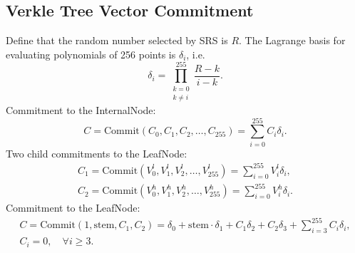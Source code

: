 \subsection{Verkle Tree Vector Commitment}

Define that the random number selected by SRS is $R$. The Lagrange basis for evaluating polynomials of 256 points is $\delta_i$, i.e.
\[ \delta_i = \prod_{\substack{k=0 \\ k\neq i}}^{255} \frac{R - k}{i - k}. \]
Commitment to the InternalNode:
\[ C = \mathrm{Commit}(C_0, C_1, C_2, \ldots, C_{255}) = \sum_{i=0}^{255}C_i\delta_i. \]
Two child commitments to the LeafNode:
\begin{gather*}
    C_1 = \mathrm{Commit}(V^l_0, V^l_1, V^l_2, \ldots, V^l_{255}) = \sum_{i=0}^{255}V^l_i\delta_i, \\
    C_2 = \mathrm{Commit}(V^h_0, V^h_1, V^h_2, \ldots, V^h_{255}) = \sum_{i=0}^{255}V^h_i\delta_i.
\end{gather*}
Commitment to the LeafNode:
\begin{gather*}
    C = \mathrm{Commit}(1, \mathrm{stem}, C_1, C_2) = \delta_0 + \mathrm{stem} \cdot \delta_1 + C_1\delta_2 + C_2\delta_3+\sum_{i=3}^{255}C_i\delta_i, \\
    C_i = 0, \quad \forall i \ge 3.
\end{gather*}
